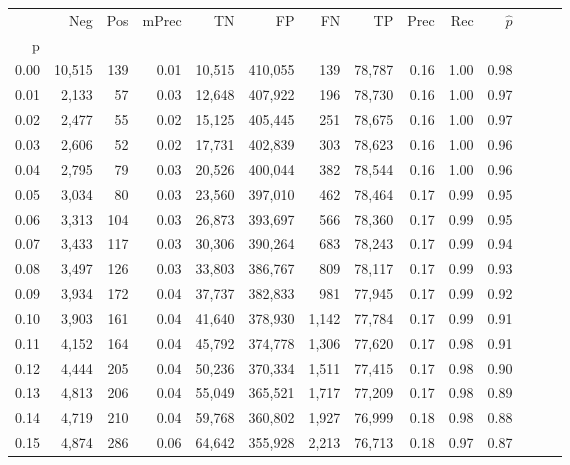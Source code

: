 \begin{tabular}{rrrrrrrrrrrrrr}
\toprule
{} &     Neg &    Pos & mPrec &       TN &       FP &      FN &      TP &  Prec &   Rec & $\hat{p}$ \\
p    &         &        &       &          &          &         &         &       &       &           \\
\midrule
0.00 &  10,515 &    139 &  0.01 &   10,515 &  410,055 &     139 &  78,787 &  0.16 &  1.00 &      0.98 \\
0.01 &   2,133 &     57 &  0.03 &   12,648 &  407,922 &     196 &  78,730 &  0.16 &  1.00 &      0.97 \\
0.02 &   2,477 &     55 &  0.02 &   15,125 &  405,445 &     251 &  78,675 &  0.16 &  1.00 &      0.97 \\
0.03 &   2,606 &     52 &  0.02 &   17,731 &  402,839 &     303 &  78,623 &  0.16 &  1.00 &      0.96 \\
0.04 &   2,795 &     79 &  0.03 &   20,526 &  400,044 &     382 &  78,544 &  0.16 &  1.00 &      0.96 \\
0.05 &   3,034 &     80 &  0.03 &   23,560 &  397,010 &     462 &  78,464 &  0.17 &  0.99 &      0.95 \\
0.06 &   3,313 &    104 &  0.03 &   26,873 &  393,697 &     566 &  78,360 &  0.17 &  0.99 &      0.95 \\
0.07 &   3,433 &    117 &  0.03 &   30,306 &  390,264 &     683 &  78,243 &  0.17 &  0.99 &      0.94 \\
0.08 &   3,497 &    126 &  0.03 &   33,803 &  386,767 &     809 &  78,117 &  0.17 &  0.99 &      0.93 \\
0.09 &   3,934 &    172 &  0.04 &   37,737 &  382,833 &     981 &  77,945 &  0.17 &  0.99 &      0.92 \\
0.10 &   3,903 &    161 &  0.04 &   41,640 &  378,930 &   1,142 &  77,784 &  0.17 &  0.99 &      0.91 \\
0.11 &   4,152 &    164 &  0.04 &   45,792 &  374,778 &   1,306 &  77,620 &  0.17 &  0.98 &      0.91 \\
0.12 &   4,444 &    205 &  0.04 &   50,236 &  370,334 &   1,511 &  77,415 &  0.17 &  0.98 &      0.90 \\
0.13 &   4,813 &    206 &  0.04 &   55,049 &  365,521 &   1,717 &  77,209 &  0.17 &  0.98 &      0.89 \\
0.14 &   4,719 &    210 &  0.04 &   59,768 &  360,802 &   1,927 &  76,999 &  0.18 &  0.98 &      0.88 \\
0.15 &   4,874 &    286 &  0.06 &   64,642 &  355,928 &   2,213 &  76,713 &  0.18 &  0.97 &      0.87 \\

\end{tabular}
